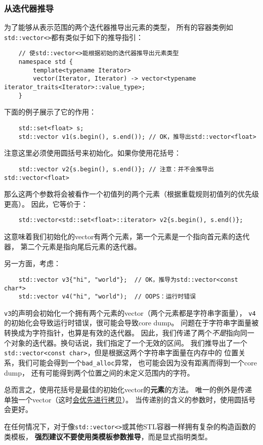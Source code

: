 \subsubsection{从迭代器推导}
为了能够从表示范围的两个迭代器推导出元素的类型，
所有的容器类例如\texttt{std::vector<>}都有类似于如下的推导指引：
\begin{lstlisting}
    // 使std::vector<>能根据初始的迭代器推导出元素类型
    namespace std {
        template<typename Iterator>
        vector(Iterator, Iterator) -> vector<typename iterator_traits<Iterator>::value_type>;
    }
\end{lstlisting}
下面的例子展示了它的作用：
\begin{lstlisting}
    std::set<float> s;
    std::vector v1(s.begin(), s.end()); // OK，推导出std::vector<float>
\end{lstlisting}
注意这里必须使用圆括号来初始化。如果你使用花括号：
\begin{lstlisting}
    std::vector v2{s.begin(), s.end()}; // 注意：并不会推导出std::vector<float>
\end{lstlisting}
那么这两个参数将会被看作一个初值列的两个元素（根据重载规则初值列的优先级更高）。
因此，它等价于：
\begin{lstlisting}
    std::vector<std::set<float>::iterator> v2{s.begin(), s.end()};
\end{lstlisting}
这意味着我们初始化的vector有两个元素，第一个元素是一个指向首元素的迭代器，
第二个元素是指向尾后元素的迭代器。

另一方面，考虑：
\begin{lstlisting}
    std::vector v3{"hi", "world"};  // OK，推导为std::vector<const char*>
    std::vector v4("hi", "world");  // OOPS：运行时错误
\end{lstlisting}
\texttt{v3}的声明会初始化一个拥有两个元素的vector（两个元素都是字符串字面量），
\texttt{v4}的初始化会导致运行时错误，很可能会导致core dump。
问题在于字符串字面量被转换成为字符指针，也算是有效的迭代器。
因此，我们传递了两个\emph{不是}指向同一个对象的迭代器。换句话说，我们指定了一个无效的区间。
我们推导出了一个\texttt{std::vector<const char>}，但是根据这两个字符串字面量在内存中的
位置关系，我们可能会得到一个\texttt{bad\_alloc}异常，
也可能会因为没有距离而得到一个core dump，
还有可能得到两个位置之间的未定义范围内的字符。

总而言之，使用花括号是最佳的初始化vector的\textbf{元素}的方法。
唯一的例外是传递单独一个vector（这时\hyperref[ch9.1.1]{会优先进行拷贝}）。
当传递别的含义的参数时，使用圆括号会更好。

在任何情况下，对于像\texttt{std::vector<>}或其他STL容器一样拥有复杂的构造函数的类模板，
\textbf{强烈建议不要使用类模板参数推导}，而是显式指明类型。

